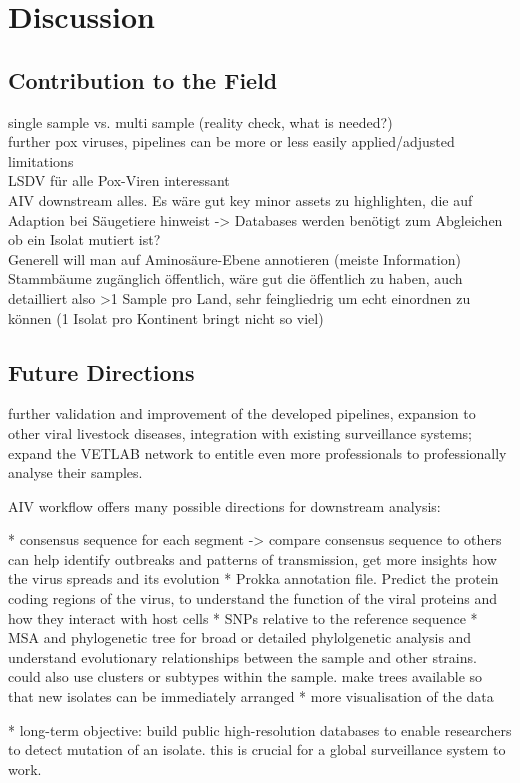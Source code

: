 \chapter{Discussion}\label{chap:discussion}

\section{Contribution to the Field}
single sample vs. multi sample (reality check, what is needed?) \\
further pox viruses, pipelines can be more or less easily applied/adjusted \\
limitations \\
LSDV für alle Pox-Viren interessant \\
AIV downstream alles. Es wäre gut key minor assets zu highlighten, die auf Adaption bei Säugetiere hinweist -> Databases werden benötigt zum Abgleichen ob ein Isolat mutiert ist? \\
Generell will man auf Aminosäure-Ebene annotieren (meiste Information) \\

Stammbäume zugänglich öffentlich, wäre gut die öffentlich zu haben, auch detailliert also >1 Sample pro Land, sehr feingliedrig um echt einordnen zu können (1 Isolat pro Kontinent bringt nicht so viel)

\section{Future Directions}
further validation and improvement of the developed pipelines, expansion to other viral livestock diseases, integration with existing surveillance systems; expand the VETLAB network to entitle even more professionals to professionally analyse their samples.

AIV workflow offers many possible directions for downstream analysis:

* consensus sequence for each segment -> compare consensus sequence to others can help identify outbreaks and patterns of transmission, get more insights how the virus spreads and its evolution
* Prokka annotation file. Predict the protein coding regions of the virus, to understand the function of the viral proteins and how they interact with host cells
* SNPs relative to the reference sequence
* MSA and phylogenetic tree for broad or detailed phylolgenetic analysis and understand evolutionary relationships between the sample and other strains. could also use clusters or subtypes within the sample. make trees available so that new isolates can be immediately arranged
* more visualisation of the data

* long-term objective: build public high-resolution databases to enable researchers to detect mutation of an isolate. this is crucial for a global surveillance system to work.